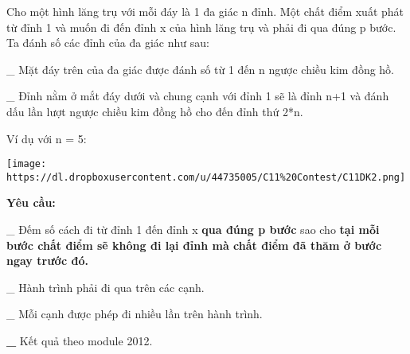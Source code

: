 Cho một hình lăng trụ với mỗi đáy là 1 đa giác n đỉnh. Một chất điểm xuất phát từ đỉnh 1 và muốn đi đến đỉnh x của hình lăng trụ và phải đi qua đúng p bước. Ta đánh số các đỉnh của đa giác như sau:  

   \_ Mặt đáy trên của đa giác được đánh số từ 1 đến n ngược chiều kim đồng hồ.  

   \_ Đỉnh nằm ở mắt đáy dưới và chung cạnh với đỉnh 1 sẽ là đỉnh n+1 và đánh dấu lần lượt ngược chiều kim đồng hồ cho đến đỉnh thứ 2*n.  

   Ví dụ với n = 5:  


\texttt{[image: https://dl.dropboxusercontent.com/u/44735005/C11\%20Contest/C11DK2.png]}

\textbf{    Yêu cầu:   }

   \_ Đếm số cách đi từ đỉnh 1 đến đỉnh x   \textbf{    qua đúng p bước   }   sao cho   \textbf{    tại mỗi bước chất điểm sẽ không đi lại đỉnh mà chất điểm đã thăm ở bước ngay trước đó.   }\textbf{}

   \_ Hành trình phải đi qua trên các cạnh.  

   \_ Mỗi cạnh được phép đi nhiều lần trên hành trình.  

\textbf{    \_   }   Kết quả theo module 2012.  

\